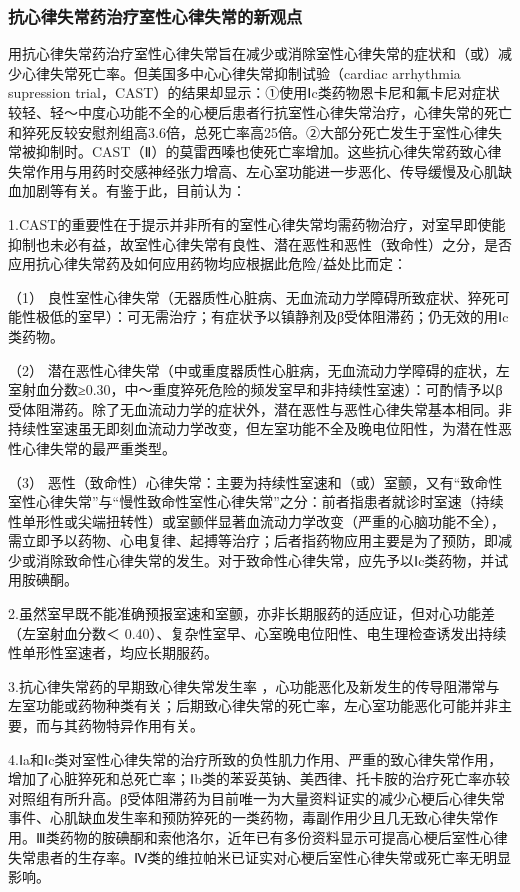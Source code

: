 \subsubsection{抗心律失常药治疗室性心律失常的新观点}

用抗心律失常药治疗室性心律失常旨在减少或消除室性心律失常的症状和（或）减少心律失常死亡率。但美国多中心心律失常抑制试验（cardiac
arrhythmia supression
trial，CAST）的结果却显示：①使用Ⅰc类药物恩卡尼和氟卡尼对症状较轻、轻～中度心功能不全的心梗后患者行抗室性心律失常治疗，心律失常的死亡和猝死反较安慰剂组高3.6倍，总死亡率高25倍。②大部分死亡发生于室性心律失常被抑制时。CAST（Ⅱ）的莫雷西嗪也使死亡率增加。这些抗心律失常药致心律失常作用与用药时交感神经张力增高、左心室功能进一步恶化、传导缓慢及心肌缺血加剧等有关。有鉴于此，目前认为：

1.CAST的重要性在于提示并非所有的室性心律失常均需药物治疗，对室早即使能抑制也未必有益，故室性心律失常有良性、潜在恶性和恶性（致命性）之分，是否应用抗心律失常药及如何应用药物均应根据此危险/益处比而定：

（1）
良性室性心律失常（无器质性心脏病、无血流动力学障碍所致症状、猝死可能性极低的室早）：可无需治疗；有症状予以镇静剂及β受体阻滞药；仍无效的用Ⅰc类药物。

（2）
潜在恶性心律失常（中或重度器质性心脏病，无血流动力学障碍的症状，左室射血分数≥0.30，中～重度猝死危险的频发室早和非持续性室速）：可酌情予以β受体阻滞药。除了无血流动力学的症状外，潜在恶性与恶性心律失常基本相同。非持续性室速虽无即刻血流动力学改变，但左室功能不全及晚电位阳性，为潜在性恶性心律失常的最严重类型。

（3）
恶性（致命性）心律失常：主要为持续性室速和（或）室颤，又有“致命性室性心律失常”与“慢性致命性室性心律失常”之分：前者指患者就诊时室速（持续性单形性或尖端扭转性）或室颤伴显著血流动力学改变（严重的心脑功能不全），需立即予以药物、心电复律、起搏等治疗；后者指药物应用主要是为了预防，即减少或消除致命性心律失常的发生。对于致命性心律失常，应先予以Ⅰc类药物，并试用胺碘酮。

2.虽然室早既不能准确预报室速和室颤，亦非长期服药的适应证，但对心功能差（左室射血分数＜
0.40）、复杂性室早、心室晚电位阳性、电生理检查诱发出持续性单形性室速者，均应长期服药。

3.抗心律失常药的早期致心律失常发生率
，心功能恶化及新发生的传导阻滞常与左室功能或药物种类有关；后期致心律失常的死亡率，左心室功能恶化可能并非主要，而与其药物特异作用有关。

4.Ⅰa和Ⅰc类对室性心律失常的治疗所致的负性肌力作用、严重的致心律失常作用，增加了心脏猝死和总死亡率；Ⅰb类的苯妥英钠、美西律、托卡胺的治疗死亡率亦较对照组有所升高。β受体阻滞药为目前唯一为大量资料证实的减少心梗后心律失常事件、心肌缺血发生率和预防猝死的一类药物，毒副作用少且几无致心律失常作用。Ⅲ类药物的胺碘酮和索他洛尔，近年已有多份资料显示可提高心梗后室性心律失常患者的生存率。Ⅳ类的维拉帕米已证实对心梗后室性心律失常或死亡率无明显影响。

